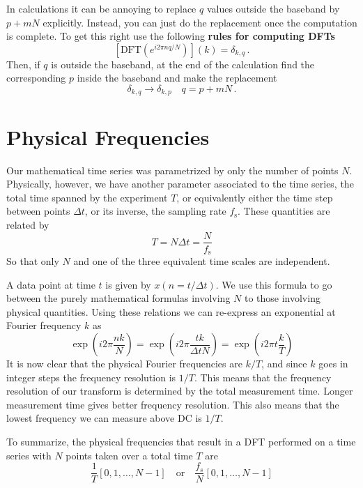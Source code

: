 \documentclass[twocolumn]{article}
\begin{document}
In calculations it can be annoying to replace $q$ values outside the baseband by $p+mN$ explicitly.
Instead, you can just do the replacement once the computation is complete.
To get this right use the following \textbf{rules for computing DFTs}
\begin{equation}
\left[ \textrm{DFT}\left( e^{i2\pi nq/N} \right)\right](k) = \delta_{k,q} \, .
\end{equation}
Then, if $q$ is outside the baseband, at the end of the calculation find the corresponding $p$ inside the baseband and make the replacement
\begin{equation}
\delta_{k,q} \rightarrow \delta_{k,p} \quad q=p+mN \, . \label{eq:aliasReplacement}
\end{equation}


\section{Physical Frequencies}

Our mathematical time series was parametrized by only the number of points $N$. Physically, however, we have another parameter associated to the time series, the total time spanned by the experiment $T$, or equivalently either the time step between points $\Delta t$, or its inverse, the sampling rate $f_{\textrm{s}}$. These quantities are related by
\begin{displaymath}
T = N\Delta t = \frac{N}{f_{\textrm{s}}}
\end{displaymath}
So that only $N$ and one of the three equivalent time scales are independent.

A data point at time $t$ is given by $x(n=t/\Delta t)$. We use this formula to go between the purely mathematical formulas involving $N$ to those involving physical quantities. Using these relations we can re-express an exponential at Fourier frequency $k$ as
\begin{displaymath}
\exp \left(i2\pi\frac{nk}{N}\right) = \exp\left(i 2 \pi \frac{tk}{\Delta t N} \right) = \exp \left( i 2\pi t\frac{k}{T} \right)
\end{displaymath}
It is now clear that the physical Fourier frequencies are $k/T$, and since $k$ goes in integer steps the frequency resolution is $1/T$. This means that the frequency resolution of our transform is determined by the total measurement time. Longer measurement time gives better frequency resolution. This also means that the lowest frequency we can measure above DC is $1/T$.

To summarize, the physical frequencies that result in a DFT performed on a time series with $N$ points taken over a total time $T$ are
\begin{displaymath}
\frac{1}{T}\left[0,1,\ldots,N-1\right]\quad\textrm{or}\quad\frac{f_{s}}{N}\left[0,1,\ldots,N-1\right]
\end{displaymath}
\end{document}
